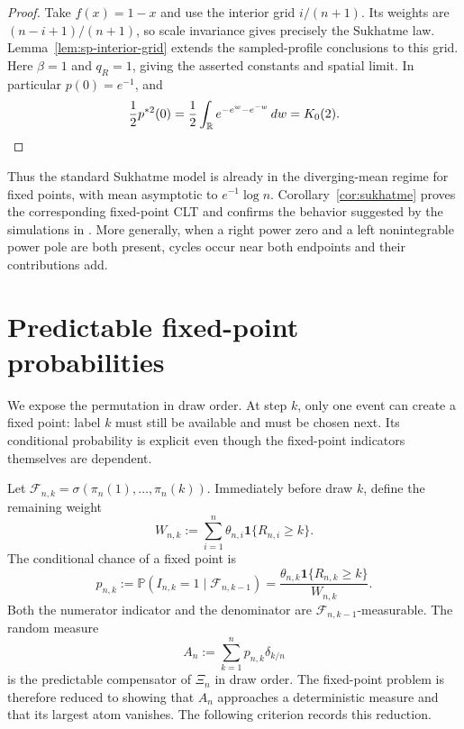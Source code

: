 \documentclass[11pt]{article}
\theoremstyle{remark}
\theoremstyle{plain}
\newcommand{\Pp}{\mathbb P}
\newcommand{\R}{\mathbb R}
\newcommand{\one}{\mathbf 1}
\newcommand{\cF}{\mathcal F}
\begin{document}
\begin{proof}
Take $f(x)=1-x$ and use the interior grid $i/(n+1)$.
Its weights are $(n-i+1)/(n+1)$, so scale invariance gives precisely the
Sukhatme law.  Lemma~\ref{lem:sp-interior-grid} extends the sampled-profile
conclusions to this grid.  Here $\beta=1$ and $q_R=1$, giving the asserted
constants and spatial limit.  In particular $p(0)=e^{-1}$, and
\[
 \frac12p^{*2}(0)
 =\frac12\int_{\R}e^{-e^w-e^{-w}}\,dw=K_0(2).\qedhere
\]
\end{proof}

Thus the standard Sukhatme model is already in the diverging-mean regime for
fixed points, with mean asymptotic to $e^{-1}\log n$.
Corollary~\ref{cor:sukhatme} proves the corresponding fixed-point CLT and
confirms the behavior suggested by the simulations in
\cite[Section~5.2]{borga2025permutonlocallimitsluce}.  More generally, when a
right power zero and a left nonintegrable power pole are both present, cycles
occur near both endpoints and their contributions add.

\section{Predictable fixed-point probabilities}

We expose the permutation in draw order.  At step $k$, only one event can
create a fixed point: label $k$ must still be available and must be chosen
next.  Its conditional probability is explicit even though the fixed-point
indicators themselves are dependent.

Let $\cF_{n,k}=\sigma(\pi_n(1),\ldots,\pi_n(k))$.  Immediately before draw
$k$, define the remaining weight
\begin{equation}\label{eq:remaining-weight}
 W_{n,k}:=\sum_{i=1}^n\theta_{n,i}\one\{R_{n,i}\ge k\}.
\end{equation}
The conditional chance of a fixed point is
\begin{equation}\label{eq:predictable-p}
 p_{n,k}:=\Pp(I_{n,k}=1\mid\cF_{n,k-1})
 =\frac{\theta_{n,k}\one\{R_{n,k}\ge k\}}{W_{n,k}}.
\end{equation}
Both the numerator indicator and the denominator are
$\cF_{n,k-1}$-measurable.  The random measure
\begin{equation}\label{eq:compensator-measure}
 A_n:=\sum_{k=1}^n p_{n,k}\delta_{k/n}
\end{equation}
is the predictable compensator of $\Xi_n$ in draw order.  The fixed-point
problem is therefore reduced to showing that $A_n$ approaches a deterministic
measure and that its largest atom vanishes.  The following criterion records
this reduction.
\end{document}
